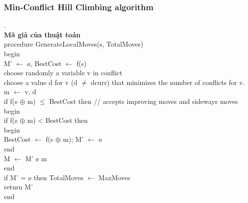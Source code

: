 \documentclass{hcmutarticle}
\begin{document}
\subsubsection{Min-Conflict Hill Climbing algorithm}.\\
{\bfseries Mã giả của thuật toán}\\
procedure GenerateLocalMoves(s, TotalMoves) \\
begin \\
    \hspace{1cm}  M' $\gets$  ø, BestCost $\gets$ f(s) \\
    \hspace{1cm} choose randomly a variable v in conflict \\ 
    \hspace{1cm} choose a value d for v (d $\neq$ dcurr) that minimizes the number of conflicts for v. \\
   \hspace{1cm}  m $\gets$ {v, d} \\ 
    \hspace{1cm} if f(s $\oplus$ m) $\leq$ BestCost then  // accepts improving moves and sideways moves \\
          \hspace{2cm} begin \\
            \hspace{2cm}  if f(s $\oplus$ m) < BestCost then \\
            \hspace{2cm}  begin \\
                  \hspace{3cm}BestCost $\gets$ f(s $\oplus$ m); M’ $\gets$ ø\\
            \hspace{2cm}  end \\
              M $\gets$  M’ ø {m} \\
           \hspace{2cm} end \\
     \hspace{1cm} if M' = ø then TotalMoves $\gets$ MaxMoves\\
    \hspace{1cm} return M’\\
end\\
\end{document}

